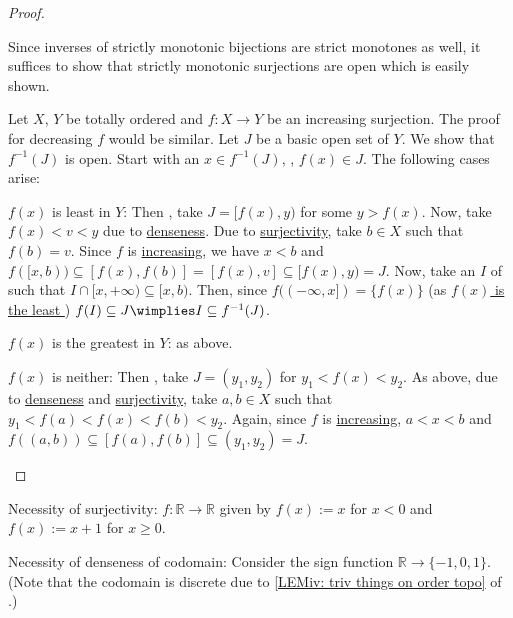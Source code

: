 	\begin{proof}
		\begin{mylist}
			\item Since inverses of strictly monotonic bijections are strict monotones as well, it suffices to show that strictly monotonic surjections are open which is easily shown.
			
			\item Let $X$, $Y$ be totally ordered and $f\colon X\to Y$ be an increasing surjection. The proof for decreasing $f$ would be similar. Let $J$ be a basic open set of $Y$. We show that $f^{-1}(J)$ is open. Start with an $x\in f^{-1}(J)$, \ie, $f(x)\in J$. The following cases arise:
			\begin{mylist}
				\item $f(x)$ is least in $Y$: Then \wlogg, take $J = [f(x), y)$ for some $y > f(x)$. Now, take $f(x) < v < y$ due to \uline{denseness}. Due to \uline{surjectivity}, take $b\in X$ such that $f(b) = v$. Since $f$ is \uline{increasing}, we have $x < b$ and $f([x, b))\subseteq [f(x), f(b)] = [f(x), v]\subseteq [f(x), y) = J$. Now, take an \onbd $I$ of such that $I\cap [x, +\infty)\subseteq [x, b)$. Then, since $f((-\infty, x]) = \{f(x)\}$ (as \uline{$f(x)$ is the least \elt}) $f(I)\subseteq J\wimplies I\subseteq f^{-1}(J)$.
				
				\item $f(x)$ is the greatest in $Y$: \Lly as above.
				
				\item $f(x)$ is neither: Then \wlogg, take $J = (y_1, y_2)$ for $y_1 < f(x) < y_2$. As above, due to \uline{denseness} and \uline{surjectivity}, take $a, b\in X$ such that $y_1 < f(a) < f(x) < f(b) < y_2$. Again, since $f$ is \uline{increasing}, $a < x < b$ and $f((a, b))\subseteq [f(a), f(b)]\subseteq (y_1, y_2) = J$.
				\qedhere
			\end{mylist}
		\end{mylist}
	\end{proof}
	
	\begin{rmk}
		\begin{mylist}
			\item Necessity of surjectivity: $f\colon \mathbb{R\to R}$ given by $f(x) := x$ for $x < 0$ and $f(x) := x + 1$ for $x\ge 0$.
			
			\item Necessity of denseness of codomain: Consider the sign function $\mathbb R\to \{-1, 0, 1\}$. (Note that the codomain is discrete due to \ref{LEMiv: triv things on order topo} of \myRef{LEM: triv things on order topo}.)
		\end{mylist}
	\end{rmk}
	



